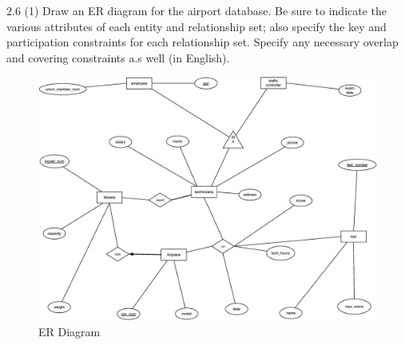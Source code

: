 \begin{problem}{2.6 (1)}
  \noindent Draw an ER diagram for the airport database. Be sure to indicate the various attributes of each entity and
  relationship set; also specify the key and participation constraints for each relationship set. Specify any necessary
  overlap and covering constraints a.s well (in English).

  \begin{solution}
    \begin{figure}[H]
      \centering
      \caption { ER Diagram }
      \includegraphics[scale=.4]{2_6.eps}
    \end{figure}
  \end{solution}
\end{problem}

